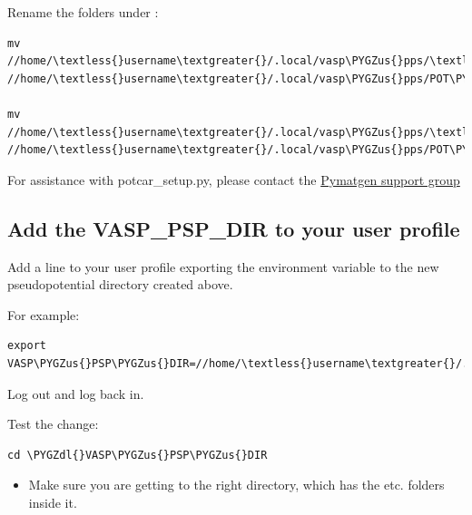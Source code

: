 \documentclass[letterpaper,10pt,english]{sphinxmanual}
\def\PYGZus{\char`\_}
\def\PYGZdl{\char`\$}
\begin{document}
Rename the folders under :

\begin{Verbatim}[commandchars=\\\{\}]
mv //home/\textless{}username\textgreater{}/.local/vasp\PYGZus{}pps/\textless{}pbe\PYGZus{}name\textgreater{} //home/\textless{}username\textgreater{}/.local/vasp\PYGZus{}pps/POT\PYGZus{}GGA\PYGZus{}PAW\PYGZus{}PBE

mv //home/\textless{}username\textgreater{}/.local/vasp\PYGZus{}pps/\textless{}pw91\PYGZus{}name\textgreater{} //home/\textless{}username\textgreater{}/.local/vasp\PYGZus{}pps/POT\PYGZus{}GGA\PYGZus{}PAW\PYGZus{}PW91
\end{Verbatim}

For assistance with potcar\_setup.py, please contact the
\href{https://groups.google.com/forum/\#!forum/pymatgen}{Pymatgen support group}


\subsection{Add the VASP\_PSP\_DIR to your user profile}
\label{1_0_installation:add-the-vasp-psp-dir-to-your-user-profile}
Add a line to your user profile exporting the environment variable  to the new pseudopotential directory created above.

For example:

\begin{Verbatim}[commandchars=\\\{\}]
export VASP\PYGZus{}PSP\PYGZus{}DIR=//home/\textless{}username\textgreater{}/.local/vasp\PYGZus{}pps
\end{Verbatim}

Log out and log back in.

Test the change:

\begin{Verbatim}[commandchars=\\\{\}]
cd \PYGZdl{}VASP\PYGZus{}PSP\PYGZus{}DIR
\end{Verbatim}
\begin{itemize}
\item {} 
Make sure you are getting to the right directory, which has the  etc. folders inside it.

\end{itemize}
\end{document}
